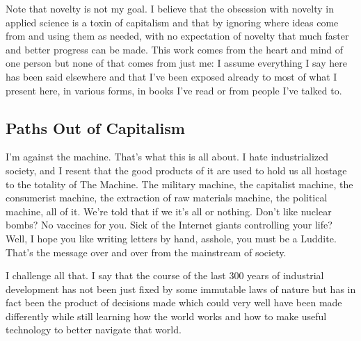 Note that novelty is not my goal. I believe that the obsession with
novelty in applied science is a toxin of capitalism and that by ignoring
where ideas come from and using them as needed, with no expectation of
novelty that much faster and better progress can be made. This work
comes from the heart and mind of one person but none of that comes from
just me: I assume everything I say here has been said elsewhere and that
I've been exposed already to most of what I present here, in various
forms, in books I've read or from people I've talked to.

\subsection{Paths Out of Capitalism}\label{paths-out-of-capitalism}

I'm against the machine. That's what this is all about. I hate
industrialized society, and I resent that the good products of it are
used to hold us all hostage to the totality of The Machine. The military
machine, the capitalist machine, the consumerist machine, the extraction
of raw materials machine, the political machine, all of it. We're told
that if we it's all or nothing. Don't like nuclear bombs? No vaccines
for you. Sick of the Internet giants controlling your life? Well, I hope
you like writing letters by hand, asshole, you must be a Luddite. That's
the message over and over from the mainstream of society.

I challenge all that. I say that the course of the last 300 years of
industrial development has not been just fixed by some immutable laws of
nature but has in fact been the product of decisions made which could
very well have been made differently while still learning how the world
works and how to make useful technology to better navigate that world.
